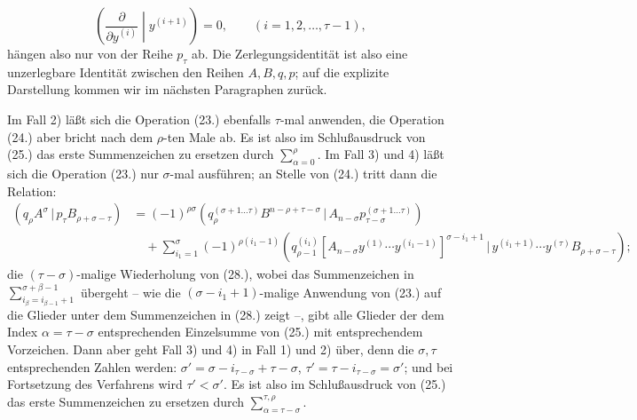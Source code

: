 \documentclass[11pt]{article}
\providecommand{\pair}[2]{(#1\,|\,#2)}
\begin{document}
\begin{equation}
 \left(\frac{\partial}{\partial y^{(i)}}\middle|y^{(i+1)}\right)=0,
 \qquad (i=1,2,\ldots,\tau-1),
\tag{27}
\end{equation}
h\"angen also nur von der Reihe $p_\tau$ ab. Die Zerlegungsidentit\"at ist also eine unzerlegbare Identit\"at zwischen den Reihen $A,B,q,p$; auf die explizite Darstellung kommen wir im n\"achsten Paragraphen zur\"uck.

Im Fall 2) l\"a\ss t sich die Operation (23.) ebenfalls $\tau$-mal anwenden, die Operation (24.) aber bricht nach dem $\rho$-ten Male ab. Es ist also im Schlu\ss ausdruck von (25.) das erste Summenzeichen zu ersetzen durch $\sum_{\alpha=0}^{\rho}$. Im Fall 3) und 4) l\"a\ss t sich die Operation (23.) nur $\sigma$-mal ausf\"uhren; an Stelle von (24.) tritt dann die Relation:
\begin{equation}
\begin{aligned}
\pair{q_\rho A^\sigma}{p_\tau B_{\rho+\sigma-\tau}}
&=(-1)^{\rho\sigma}
 \pair{q_\rho^{(\sigma+1\ldots\tau)}B^{n-\rho+\tau-\sigma}}{A_{n-\sigma}p_{\tau-\sigma}^{(\sigma+1\ldots\tau)}}\\
&\quad+\sum_{i_1=1}^{\sigma}(-1)^{\rho(i_1-1)}
 \pair{q_{\rho-1}^{(i_1)}[A_{n-\sigma}y^{(1)}\cdots y^{(i_1-1)}]^{\sigma-i_1+1}}
 {y^{(i_1+1)}\cdots y^{(\tau)}B_{\rho+\sigma-\tau}};
\end{aligned}
\tag{28}
\end{equation}
die $(\tau-\sigma)$-malige Wiederholung von (28.), wobei das Summenzeichen in $\sum_{i_\beta=i_{\beta-1}+1}^{\sigma+\beta-1}$ \"ubergeht -- wie die $(\sigma-i_1+1)$-malige Anwendung von (23.) auf die Glieder unter dem Summenzeichen in (28.) zeigt --, gibt alle Glieder der dem Index $\alpha=\tau-\sigma$ entsprechenden Einzelsumme von (25.) mit entsprechendem Vorzeichen. Dann aber geht Fall 3) und 4) in Fall 1) und 2) \"uber, denn die $\sigma,\tau$ entsprechenden Zahlen werden: $\sigma'=\sigma-i_{\tau-\sigma}+\tau-\sigma$, $\tau'=\tau-i_{\tau-\sigma}=\sigma'$; und bei Fortsetzung des Verfahrens wird $\tau'<\sigma'$. Es ist also im Schlu\ss ausdruck von (25.) das erste Summenzeichen zu ersetzen durch $\sum_{\alpha=\tau-\sigma}^{\tau,\rho}$.
\end{document}
